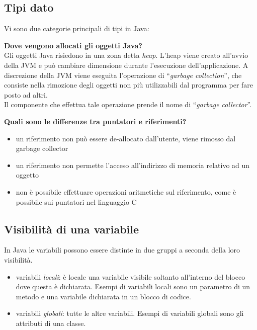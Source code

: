 \documentclass{article}
\begin{document}
\subsection{Tipi dato}
Vi sono due categorie principali di tipi in Java:



\textbf{Dove vengono allocati gli oggetti Java?}\\
Gli oggetti Java risiedono in una zona detta \emph{heap}. L'heap viene creato all'avvio della JVM e può cambiare dimensione durante l'esecuzione 
dell'applicazione. A discrezione della JVM viene eseguita l'operazione di ``\emph{garbage collection}'', che consiste nella rimozione degli oggetti non più utilizzabili dal programma per fare posto ad altri.\\
Il componente che effettua tale operazione prende il nome di ``\emph{garbage collector}''.


\textbf{Quali sono le differenze tra puntatori e riferimenti?}
\begin{itemize}
\item un riferimento non può essere de-allocato dall'utente, viene rimosso dal garbage collector
\item un riferimento non permette l'acceso all'indirizzo di memoria relativo ad un oggetto%
\item non è possibile effettuare operazioni aritmetiche sul riferimento, come è possibile sui puntatori nel linguaggio C
\end{itemize}


\subsection{Visibilità di una variabile}

In Java le variabili possono essere distinte in due gruppi a seconda della loro visibilità.

\begin{itemize}
\item variabili \emph{locali}: è locale una variabile visibile soltanto all'interno del blocco dove questa è dichiarata.
Esempi di variabili locali sono un parametro di un metodo e una variabile dichiarata in un blocco di codice.
\item variabili \emph{globali}: tutte le altre variabili. Esempi di variabili globali sono gli attributi di una classe.
\end{itemize}
\end{document}
